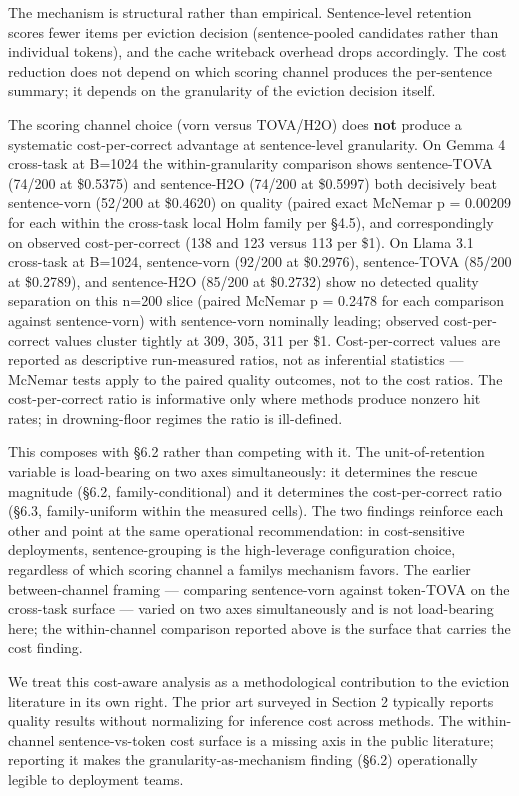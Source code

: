 \documentclass[10pt]{article}
\begin{document}
The mechanism is structural rather than empirical. Sentence-level
retention scores fewer items per eviction decision (sentence-pooled
candidates rather than individual tokens), and the cache writeback
overhead drops accordingly. The cost reduction does not depend on which
scoring channel produces the per-sentence summary; it depends on the
granularity of the eviction decision itself.

The scoring channel choice (vorn versus TOVA/H2O) does
\textbf{not} produce a systematic cost-per-correct advantage at
sentence-level granularity. On Gemma 4 cross-task at B=1024 the
within-granularity comparison shows sentence-TOVA (74/200 at
\$0.5375) and sentence-H2O (74/200 at \$0.5997) both decisively
beat sentence-vorn (52/200 at \$0.4620) on quality (paired exact McNemar
p = 0.00209 for each within the cross-task local Holm family per \S{}4.5),
and correspondingly on observed cost-per-correct (138 and 123 versus 113
per \$1). On Llama 3.1 cross-task at B=1024, sentence-vorn (92/200 at
\$0.2976), sentence-TOVA (85/200 at \$0.2789), and
sentence-H2O (85/200 at \$0.2732) show no detected quality
separation on this n=200 slice (paired McNemar p = 0.2478 for each
comparison against sentence-vorn) with sentence-vorn nominally leading;
observed cost-per-correct values cluster tightly at 309, 305, 311 per
\$1. Cost-per-correct values are reported as descriptive run-measured
ratios, not as inferential statistics --- McNemar tests apply to the
paired quality outcomes, not to the cost ratios. The cost-per-correct
ratio is informative only where methods produce nonzero hit rates; in
drowning-floor regimes the ratio is ill-defined.

This composes with \S{}6.2 rather than competing with it. The
unit-of-retention variable is load-bearing on two axes simultaneously:
it determines the rescue magnitude (\S{}6.2, family-conditional) and it
determines the cost-per-correct ratio (\S{}6.3, family-uniform within the
measured cells). The two findings reinforce each other and point at the
same operational recommendation: in cost-sensitive deployments,
sentence-grouping is the high-leverage configuration choice, regardless
of which scoring channel a family\textquotesingle s mechanism favors.
The earlier between-channel framing --- comparing sentence-vorn against
token-TOVA on the cross-task surface --- varied on two axes
simultaneously and is not load-bearing here; the within-channel
comparison reported above is the surface that carries the cost finding.

We treat this cost-aware analysis as a methodological contribution to
the eviction literature in its own right. The prior art surveyed in
Section 2 typically reports quality results without normalizing for
inference cost across methods. The within-channel sentence-vs-token cost
surface is a missing axis in the public literature; reporting it makes
the granularity-as-mechanism finding (\S{}6.2) operationally legible to
deployment teams.
\end{document}
